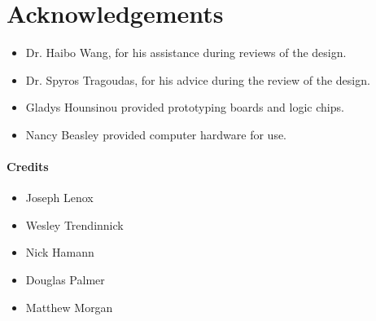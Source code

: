 \section*{Acknowledgements}
\begin{itemize}
\item Dr. Haibo Wang, for his assistance during reviews of the design. 
\item Dr. Spyros Tragoudas, for his advice during the review of the design.
\item Gladys Hounsinou provided prototyping boards and logic chips.
\item Nancy Beasley provided computer hardware for use.
\end{itemize}

\paragraph{Credits}
\begin{itemize}
\item Joseph Lenox
\item Wesley Trendinnick
\item Nick Hamann
\item Douglas Palmer
\item Matthew Morgan
\end{itemize}
